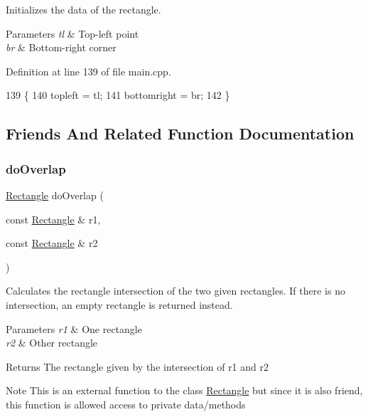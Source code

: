 Initializes the data of the rectangle. 


\begin{DoxyParams}{Parameters}
{\em tl} & Top-\/left point \\
\hline
{\em br} & Bottom-\/right corner \\
\hline
\end{DoxyParams}


Definition at line 139 of file main.\+cpp.


\begin{DoxyCode}
139                                                            \{
140         topleft = tl;
141         bottomright = br;
142     \}
\end{DoxyCode}


\subsection{Friends And Related Function Documentation}
\mbox{\label{classRectangle_a888d2b0113947b4461107bb02b28799d}} 
\subsubsection{\texorpdfstring{do\+Overlap}{doOverlap}}
{\footnotesize\ttfamily \hyperlink{classRectangle}{Rectangle} do\+Overlap (\begin{DoxyParamCaption}\item[{const \hyperlink{classRectangle}{Rectangle} \&}]{r1,  }\item[{const \hyperlink{classRectangle}{Rectangle} \&}]{r2 }\end{DoxyParamCaption})\hspace{0.3cm}{\ttfamily [friend]}}



Calculates the rectangle intersection of the two given rectangles. If there is no intersection, an empty rectangle is returned instead. 


\begin{DoxyParams}{Parameters}
{\em r1} & One rectangle \\
\hline
{\em r2} & Other rectangle \\
\hline
\end{DoxyParams}
\begin{DoxyReturn}{Returns}
The rectangle given by the intersection of {\ttfamily r1} and {\ttfamily r2} 
\end{DoxyReturn}
\begin{DoxyNote}{Note}
This is an external function to the class \hyperlink{classRectangle}{Rectangle} but since it is also friend, this function is allowed access to private data/methods 
\end{DoxyNote}


